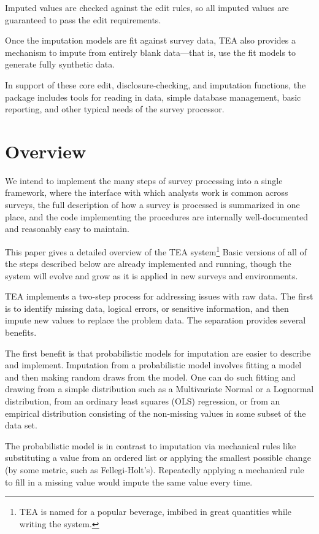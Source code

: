 \documentclass{article}
\begin{document}
Imputed values are checked against the edit rules, so all imputed values
are guaranteed to pass the edit requirements.

Once the imputation models are fit against survey data, TEA also provides
a mechanism to impute from entirely blank data---that is, use the fit
models to generate fully synthetic data.

In support of these core edit, disclosure-checking, and imputation
functions, the package includes tools for reading in data, simple
database management, basic reporting, and other typical needs of the
survey processor.

\section{Overview}
{\sc We intend} to implement the many steps of survey processing into a single
framework, where the interface with which analysts work is common across surveys,
the full description of how a survey is processed is summarized in one place, and the
code implementing the procedures are internally well-documented and reasonably easy
to maintain.

This paper gives a detailed overview of the TEA system\footnote{TEA is named for
a popular beverage, imbibed in great quantities while writing the system.} Basic
versions of all of the steps described below are already implemented and running,
though the system will evolve and grow as it is applied in new surveys and environments.

TEA implements a two-step process for addressing issues with raw data. The first is
to identify missing data, logical errors, or sensitive information, and then impute
new values to replace the problem data. The separation provides several benefits.


The first benefit is that probabilistic models for imputation are easier to describe
and implement.  Imputation from a probabilistic model involves fitting a model and
then making random draws from the model. One can do such fitting and drawing from a
simple distribution such as a Multivariate Normal or a Lognormal distribution, from an
ordinary least squares (OLS) regression, or from an empirical distribution consisting
of the non-missing values in some subset of the data set.

The probabilistic model is in contrast to imputation via mechanical rules like
substituting a value from an ordered list or applying the smallest possible change
(by some metric, such as Fellegi-Holt's). Repeatedly applying a mechanical rule to
fill in a missing value would impute the same value every time.
\end{document}
